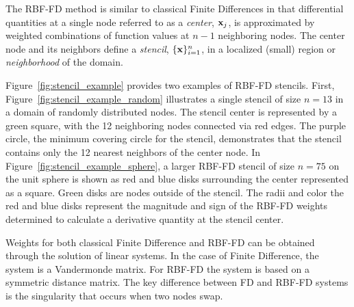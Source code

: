 \documentclass{report}
\begin{document}
{The RBF-FD method is similar to classical Finite Differences in that differential quantities at a single node referred to as a \emph{center}, $\mathbf{x}_{j}$, is approximated by weighted combinations of function values at $n-1$ neighboring nodes. The center node and its neighbors define a \emph{stencil}, $\{\mathbf{x}\}_{i=1}^{n}$, in a localized (small) region or \emph{neighborhood} of the domain. 

Figure~\ref{fig:stencil_example} provides two examples of RBF-FD stencils. First, Figure~\ref{fig:stencil_example_random} illustrates a single stencil of size $n=13$ in a domain of randomly distributed nodes. The stencil center is represented by a green square, with the 12 neighboring nodes connected via red edges. The purple circle, the minimum covering circle for the stencil, demonstrates that the stencil contains only the 12 nearest neighbors of the center node. In Figure~\ref{fig:stencil_example_sphere}, a larger RBF-FD stencil of size $n=75$ on the unit sphere is shown as red and blue disks surrounding the center represented as a square. Green disks are nodes outside of the stencil. The radii and color the red and blue disks represent the magnitude and sign of the RBF-FD weights determined to calculate a derivative quantity at the stencil center. 

Weights for both classical Finite Difference and RBF-FD can be obtained through the solution of linear systems. In the case of Finite Difference, the system is a Vandermonde matrix. For RBF-FD the system is based on a symmetric distance matrix.  The key difference between FD and RBF-FD systems is the singularity that occurs when two nodes swap.


}
\end{document}
